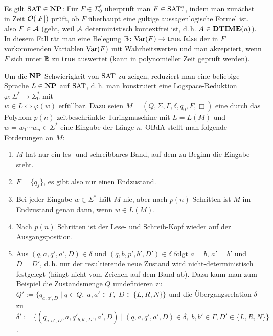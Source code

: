 \begin{Beweis}
    Es gilt $\text{SAT} \in \mathbf{NP}$:
    Für $F \in \Sigma_0^\ast$ überprüft man $F \in \text{SAT}?$, indem man zunächst in Zeit $\mathcal{O}(|F|)$
    prüft, ob $F$ überhaupt eine gültige aussagenlogische Formel ist, also $F \in \mathcal{A}$
    (geht, weil $\mathcal{A}$ deterministisch kontextfrei ist, d.\,h. $A \in \mathbf{DTIME}(n)$).
    In diesem Fall rät man eine Belegung $\mathbb{B}\colon \text{Var}(F) \rightarrow {\ensuremath{\text{true}}, \ensuremath{\text{false}}}$
    der in $F$ vorkommenden Variablen $\text{Var}(F)$ mit Wahrheitswerten
    und man akzeptiert, wenn $F$ sich unter $\mathbb{B}$ zu $\text{true}$ auswertet
    (kann in polynomieller Zeit geprüft werden).
    
    Um die $\mathbf{NP}$-Schwierigkeit von $\text{SAT}$ zu zeigen,
    reduziert man eine beliebige Sprache $L \in \mathbf{NP}$ auf $\text{SAT}$, d.\,h.
    man konstruiert eine Logspace-Reduktion
    $\varphi\colon \Sigma^\ast \rightarrow \Sigma_0^\ast$ mit\\
    $w \in L \iff \varphi(w) \text{ erfüllbar}$.
    Dazu seien $M = (Q, \Sigma, \Gamma, \delta, q_0, F, \Box)$ eine durch das Polynom $p(n)$
    zeitbeschränkte Turingmaschine mit $L = L(M)$
    und $w = w_1 \dotsb w_n \in \Sigma^\ast$ eine Eingabe der Länge $n$.
    OBdA stellt man folgende Forderungen an $M$:
    \begin{enumerate}
        \item
        $M$ hat nur ein les- und schreibbares Band, auf dem zu Beginn die Eingabe steht.
        
        \item
        $F = \{q_f\}$, es gibt also nur einen Endzustand.
        
        \item
        Bei jeder Eingabe $w \in \Sigma^\ast$ hält $M$ nie, aber nach $p(n)$ Schritten ist $M$
        im Endzustand genau dann, wenn $w \in L(M)$.
        
        \item
        Nach $p(n)$ Schritten ist der Lese- und Schreib-Kopf wieder auf der Ausgangsposition.
        
        \item
        Aus $(q, a, q', a', D) \in \delta$ und $(q, b, p', b', D') \in \delta$ folgt
        $a = b$, $a' = b'$ und $D = D'$,
        d.\,h. nur der resultierende neue Zustand wird nicht-deterministisch festgelegt
        (hängt nicht vom Zeichen auf dem Band ab).
        Dazu kann man zum Beispiel die Zustandsmenge $Q$ umdefinieren zu
        $Q' := \{q_{a,a',D} \;|\; q \in Q,\; a, a' \in \Gamma,\;
        D \in \{L, R, N\}\}$
        und die Übergangsrelation $\delta$ zu\\
        $\delta' := \{(q_{a,a',D}, a, q'_{b,b',D'}, a', D) \;|\; (q, a, q', a', D) \in \delta,\;
        b, b' \in \Gamma, D' \in \{L, R, N\}\}$.
    \end{enumerate}
    

\end{Beweis}
